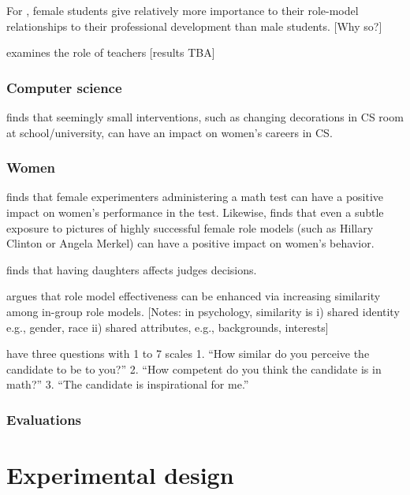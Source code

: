 \documentclass[12pt, titlepage]{article}
\begin{document}
For \citet{gilbert1985dimensions}, female students give relatively more
importance to their role-model relationships to their professional
development than male students. {[}Why so?{]}

\citet{dee2004teachers} examines the role of teachers {[}results TBA{]}

\subsubsection{Computer science}\label{computer-science}

\citet{cheryan2013enduring} finds that seemingly small interventions,
such as changing decorations in CS room at school/university, can have
an impact on women's careers in CS.

\subsubsection{Women}\label{women}

\citet{marx2002female} finds that female experimenters administering a
math test can have a positive impact on women's performance in the test.
Likewise, \citet{latu2013successful} finds that even a subtle exposure
to pictures of highly successful female role models (such as Hillary
Clinton or Angela Merkel) can have a positive impact on women's
behavior.

\citet{glynn2015identifying} finds that having daughters affects judges
decisions.

\citet{marx2012superstars} argues that role model effectiveness can be
enhanced via increasing similarity among in-group role models. {[}Notes:
in psychology, similarity is i) shared identity e.g., gender, race ii)
shared attributes, e.g., backgrounds, interests{]}

\citep[ p.~809]{marx2012superstars} have three questions with 1 to 7
scales 1. ``How similar do you perceive the candidate to be to you?'' 2.
``How competent do you think the candidate is in math?'' 3. ``The
candidate is inspirational for me.''

\subsubsection{Evaluations}\label{evaluations}

\citet{bohnet2015performance}

\section{Experimental design}\label{experimental-design}
\end{document}
